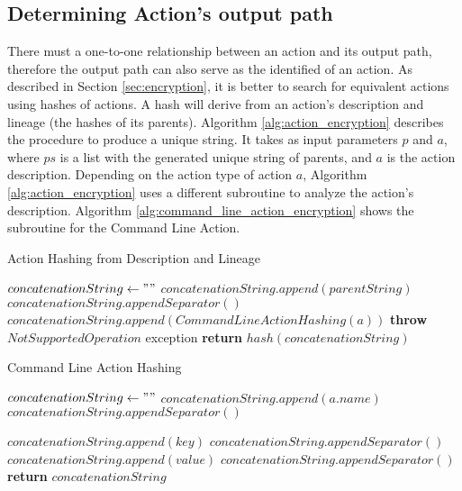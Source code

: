 \subsection{Determining Action's output path}
There must a one-to-one relationship between an action and its output path, therefore the output path can also serve as the identified of an action. As described in Section \ref{sec:encryption}, it is better to search for equivalent actions using hashes of actions. A hash will derive from an action's description and lineage (the hashes of its parents). Algorithm \ref{alg:action_encryption} describes the procedure to produce a unique string.  It takes as input parameters $p$ and $a$, where $ps$ is a list with the generated unique string of parents, and $a$ is the action description.  Depending on the action type of action $a$, Algorithm \ref{alg:action_encryption} uses a different subroutine to analyze the action's description. Algorithm \ref{alg:command_line_action_encryption} shows the subroutine for the Command Line Action.

\begin{algorithm}
\begin{singlespace}
\caption{Action Hashing from Description and Lineage}
\label{alg:action_encryption}
\begin{algorithmic}[1]
\State $concatenationString \gets ""$
	\State $concatenationString.append(parentString)$
	\State $concatenationString.appendSeparator()$
\EndFor
{}
	\State $concatenationString.append(CommandLineActionHashing(a))$
\Else
	\State \textbf{throw} $NotSupportedOperation$ exception
\EndIf
\State \textbf{return} $hash(concatenationString)$

\EndProcedure
\end{algorithmic}
\end{singlespace}
\end{algorithm}

\begin{algorithm}
\begin{singlespace}
\caption{Command Line Action Hashing}
\label{alg:command_line_action_encryption}
\begin{algorithmic}[1]
\State $concatenationString \gets " "$
\State $concatenationString.append(a.name)$
\State $concatenationString.appendSeparator()$

	\State $concatenationString.append(key)$
	\State $concatenationString.appendSeparator()$
	\State $concatenationString.append(value)$
	\State $concatenationString.appendSeparator()$
\EndFor
	\State \textbf{return} $concatenationString$
\EndProcedure
\end{algorithmic}
\end{singlespace}
\end{algorithm}

